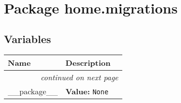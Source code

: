 %
%
%


\section{Package home.migrations}

    \label{home:migrations}


  \subsection{Variables}

    \vspace{-1cm}
\hspace{\varindent}\begin{longtable}{|p{\varnamewidth}|p{\vardescrwidth}|l}
\cline{1-2}
\cline{1-2} \centering \textbf{Name} & \centering \textbf{Description}& \\
\cline{1-2}
\endhead\cline{1-2}\multicolumn{3}{r}{\small\textit{continued on next page}}\\\endfoot\cline{1-2}
\endlastfoot\raggedright \_\-\_\-p\-a\-c\-k\-a\-g\-e\-\_\-\_\- & \raggedright \textbf{Value:} 
{\tt None}&\\
\cline{1-2}
\end{longtable}

